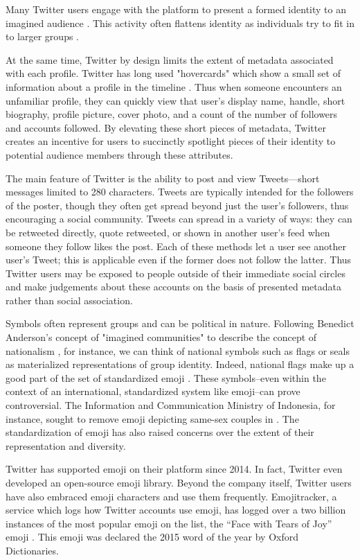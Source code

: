 Many Twitter users engage with the platform to present a formed
identity to an imagined audience \cite{marwick2011tweet}. This
activity often flattens identity as individuals try to fit in to
larger groups \cite{boyd2008taken}.

At the same time, Twitter by design limits the extent of metadata
associated with each profile. Twitter has long used "hovercards" which
show a small set of information about a profile in the
timeline \cite{twitterhover}. Thus when someone encounters an
unfamiliar profile, they can quickly view that user’s display name,
handle, short biography, profile picture, cover photo, and a count of
the number of followers and accounts followed. By elevating these
short pieces of metadata, Twitter creates an incentive for users to
succinctly spotlight pieces of their identity to potential audience
members through these attributes.

The main feature of Twitter is the ability to post and view
Tweets---short messages limited to 280 characters. Tweets
are typically intended for the followers of the poster, though they
often get spread beyond just the user’s followers, thus encouraging a
social community. Tweets can spread in a variety of ways: they can be
retweeted directly, quote retweeted, or shown in another user’s feed
when someone they follow likes the post. Each of these methods let a
user see another user’s Tweet; this is applicable even if the former
does not follow the latter. Thus Twitter users may be exposed to
people outside of their immediate social circles and make judgements
about these accounts on the basis of presented metadata rather than
social association.

Symbols often represent groups and can be political in
nature. Following Benedict Anderson’s concept of "imagined
communities" to describe the concept of
nationalism \cite{anderson2006imagined}, for instance, we can think of
national symbols such as flags or seals as materialized
representations of group identity. Indeed, national flags make up a
good part of the set of standardized emoji \cite{unicodeemoji}. These
symbols–even within the context of an international, standardized
system like emoji–can prove controversial. The Information and
Communication Ministry of Indonesia, for instance, sought to remove
emoji depicting same-sex couples in
\cite{boellstorff2016against}. The standardization of emoji has
also raised concerns over the extent of their representation and
diversity.

Twitter has supported emoji on their platform since 2014. In fact,
Twitter even developed an open-source emoji library. Beyond the
company itself, Twitter users have also embraced emoji characters and
use them frequently. Emojitracker, a service which logs how Twitter
accounts use emoji, has logged over a two billion instances of the
most popular emoji on the list, the “Face with Tears of Joy”
emoji \cite{emojitracker}. This emoji was declared the 2015 word of the
year by Oxford Dictionaries.

